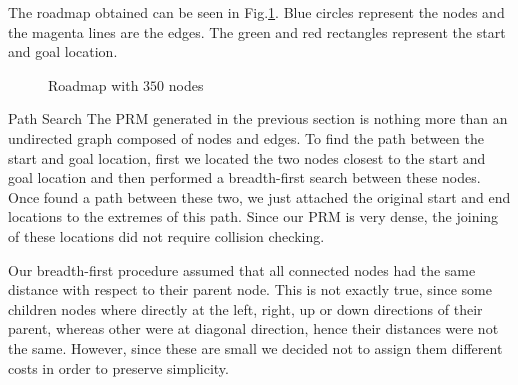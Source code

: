 \documentclass[conference]{IEEEtran}
\makeatletter
\renewcommand\section{\@startsection{section}{1}{\z@}
                                  {-3.0ex plus -1.5ex minus -0.5ex}
                                  {0.7ex plus 1ex minus 0ex}
                                  {\bfseries}}
\makeatother
\begin{document}
The roadmap obtained can be seen in Fig.\ref{fig:roadmap}. Blue circles
represent the nodes and the magenta lines are the edges. The green
and red rectangles represent the start and goal location.

\begin{figure}[h]
	\centering
	\caption{Roadmap with $350$ nodes}
	\label{fig:roadmap}
\end{figure} 

\section{Path Search}
\label{sec:PathSearch}
The PRM generated in the previous section is nothing more than an
undirected graph composed of nodes and edges. To find the path between
the start and goal location, first we located the two nodes closest to 
the start and goal location and then performed a breadth-first search
between these nodes. Once found a path between these two, we just attached the original start
and end locations to the extremes of this path. Since our PRM is very dense,
the joining of these locations did not require collision checking.

Our breadth-first procedure assumed that all connected nodes had the same
distance with respect to their parent node. This is not exactly true, since
some children nodes where directly at the left, right, up or down directions 
of their parent, whereas other were at diagonal direction, hence their distances
were not the same. However, since these are small we decided not to assign them
different costs in order to preserve simplicity.
\end{document}
